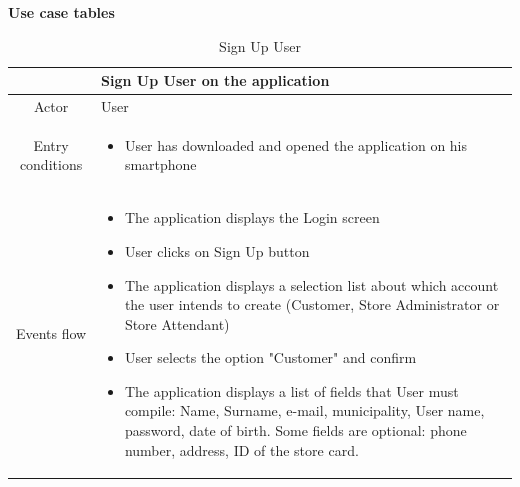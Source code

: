 \documentclass[table, 12pt]{article}
\begin{document}
\textbf{Use case tables}

\begin{longtable}{ | c | p{10cm} | }
    \caption{Sign Up User}                                                                                                                                                                                                                                                                    \\

    \hline
                     & Sign Up User on the application                                                                                                                                                                                                                                        \\
    \hline
    Actor            & User                                                                                                                                                                                                                                                                   \\
    \hline
    Entry conditions &
    \begin{itemize}
        \item User has downloaded and opened the application on his smartphone
    \end{itemize}                                                                                                                                                                                                                                                                \\
    \hline
    Events flow      & \begin{itemize}[nosep,after=\strut]
        \item The application displays the Login screen
        \item User clicks on Sign Up button
        \item The application displays a selection list about which account the user intends to create (Customer, Store Administrator or Store Attendant)
        \item User selects the option "Customer" and confirm
        \item The application displays a list of fields that User must compile: Name, Surname, e-mail, municipality, User name, password, date of birth. Some fields are optional: phone number, address, ID of the store card.

\end{itemize}
\end{longtable}
\end{document}
